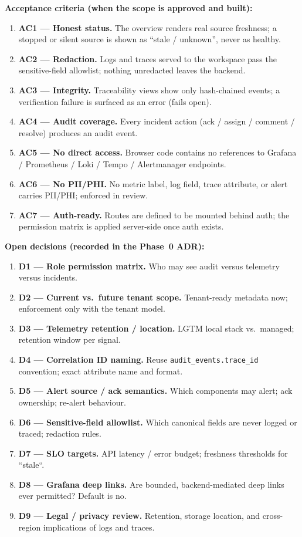 \documentclass[11pt]{article}
\newcommand{\code}[1]{\texttt{#1}}
\begin{document}
\textbf{Acceptance criteria (when the scope is approved and built):}
\begin{enumerate}
\item \textbf{AC1 --- Honest status.} The overview renders real source
      freshness; a stopped or silent source is shown as ``stale / unknown'',
      never as healthy.
\item \textbf{AC2 --- Redaction.} Logs and traces served to the workspace pass
      the sensitive-field allowlist; nothing unredacted leaves the backend.
\item \textbf{AC3 --- Integrity.} Traceability views show only hash-chained
      events; a verification failure is surfaced as an error (fails open).
\item \textbf{AC4 --- Audit coverage.} Every incident action
      (ack / assign / comment / resolve) produces an audit event.
\item \textbf{AC5 --- No direct access.} Browser code contains no references
      to Grafana / Prometheus / Loki / Tempo / Alertmanager endpoints.
\item \textbf{AC6 --- No PII/PHI.} No metric label, log field, trace attribute,
      or alert carries PII/PHI; enforced in review.
\item \textbf{AC7 --- Auth-ready.} Routes are defined to be mounted behind
      auth; the permission matrix is applied server-side once auth exists.
\end{enumerate}

\textbf{Open decisions (recorded in the Phase~0 ADR):}
\begin{enumerate}
\item \textbf{D1 --- Role permission matrix.} Who may see audit versus
      telemetry versus incidents.
\item \textbf{D2 --- Current vs.\ future tenant scope.} Tenant-ready metadata
      now; enforcement only with the tenant model.
\item \textbf{D3 --- Telemetry retention / location.} LGTM local stack vs.\
      managed; retention window per signal.
\item \textbf{D4 --- Correlation ID naming.} Reuse \code{audit\_events.trace\_id}
      convention; exact attribute name and format.
\item \textbf{D5 --- Alert source / ack semantics.} Which components may alert;
      ack ownership; re-alert behaviour.
\item \textbf{D6 --- Sensitive-field allowlist.} Which canonical fields are
      never logged or traced; redaction rules.
\item \textbf{D7 --- SLO targets.} API latency / error budget; freshness
      thresholds for ``stale``.
\item \textbf{D8 --- Grafana deep links.} Are bounded, backend-mediated deep
      links ever permitted? Default is no.
\item \textbf{D9 --- Legal / privacy review.} Retention, storage location, and
      cross-region implications of logs and traces.
\end{enumerate}
\end{document}
